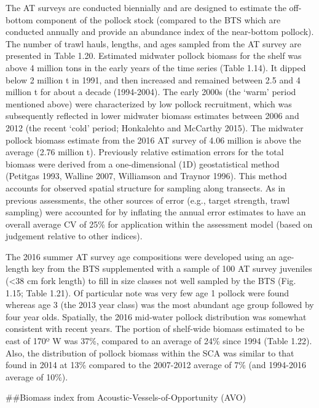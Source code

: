 The AT surveys are conducted biennially and are designed to estimate the
off- bottom component of the pollock stock (compared to the BTS which
are conducted annually and provide an abundance index of the near-bottom
pollock). The number of trawl hauls, lengths, and ages sampled from the
AT survey are presented in Table 1.20. Estimated midwater pollock
biomass for the shelf was above 4 million tons in the early years of the
time series (Table 1.14). It dipped below 2 million t in 1991, and then
increased and remained between 2.5 and 4 million t for about a decade
(1994-2004). The early 2000s (the `warm' period mentioned above) were
characterized by low pollock recruitment, which was subsequently
reflected in lower midwater biomass estimates between 2006 and 2012 (the
recent `cold' period; Honkalehto and McCarthy 2015). The midwater
pollock biomass estimate from the 2016 AT survey of 4.06 million is
above the average (2.76 million t). Previously relative estimation
errors for the total biomass were derived from a one-dimensional (1D)
geostatistical method (Petitgas 1993, Walline 2007, Williamson and
Traynor 1996). This method accounts for observed spatial structure for
sampling along transects. As in previous assessments, the other sources
of error (e.g., target strength, trawl sampling) were accounted for by
inflating the annual error estimates to have an overall average CV of
25\% for application within the assessment model (based on judgement
relative to other indices).

The 2016 summer AT survey age compositions were developed using an
age-length key from the BTS supplemented with a sample of 100 AT survey
juveniles (\textless{}38 cm fork length) to fill in size classes not
well sampled by the BTS (Fig. 1.15; Table 1.21). Of particular note was
very few age 1 pollock were found whereas age 3 (the 2013 year class)
was the most abundant age group followed by four year olds. Spatially,
the 2016 mid-water pollock distribution was somewhat consistent with
recent years. The portion of shelf-wide biomass estimated to be east of
170º W was 37\%, compared to an average of 24\% since 1994 (Table 1.22).
Also, the distribution of pollock biomass within the SCA was similar to
that found in 2014 at 13\% compared to the 2007-2012 average of 7\% (and
1994-2016 average of 10\%).

\#\#Biomass index from Acoustic-Vessels-of-Opportunity (AVO)

